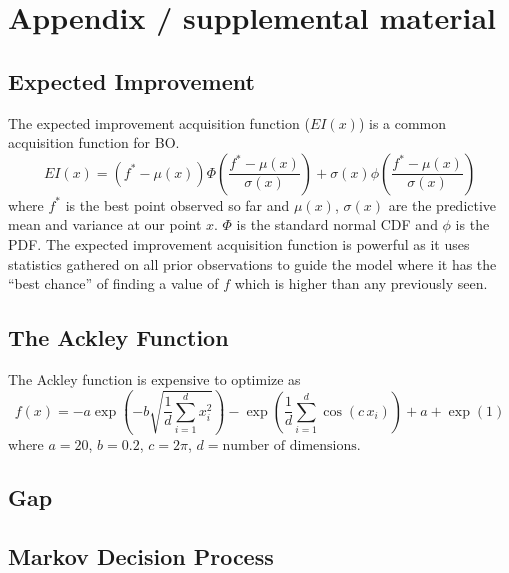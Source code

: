 \documentclass{article}
\begin{document}

\appendix

\section{Appendix / supplemental material}

\subsection{Expected Improvement}

The expected improvement acquisition function ($EI(x)$) is a common acquisition function for BO. 
\[EI(x) = (f^* - \mu(x))\Phi \left( \frac{f^* - \mu(x)}
{\sigma(x)}\right) + \sigma(x)\phi \left(\frac{f^* - \mu(x)}
{\sigma(x)}\right)\]
where $f^*$ is the best point observed so far and $\mu(x)$, $\sigma(x)$ are the predictive mean and variance at our point $x$. $\Phi$ is the standard normal CDF and $\phi$ is the PDF. The expected improvement acquisition function is powerful as it uses statistics gathered on all prior observations to guide the model where it has the ``best chance'' of finding a value of $f$ which is higher than any previously seen.

\subsection{The Ackley Function}
The Ackley function is expensive to optimize as
\[
f(x) = -a \exp\left(-b \sqrt{\frac{1}{d} \sum_{i=1}^{d} x_i^2}\right) - \exp\left(\frac{1}{d} \sum_{i=1}^{d} \cos(c \, x_i)\right) + a + \exp(1)
\]
where $a = 20$, $b = 0.2$, $c = 2 \pi$, $d = \text{number of dimensions}$.

\subsection{Gap}

\subsection{Markov Decision Process}

\end{document}

